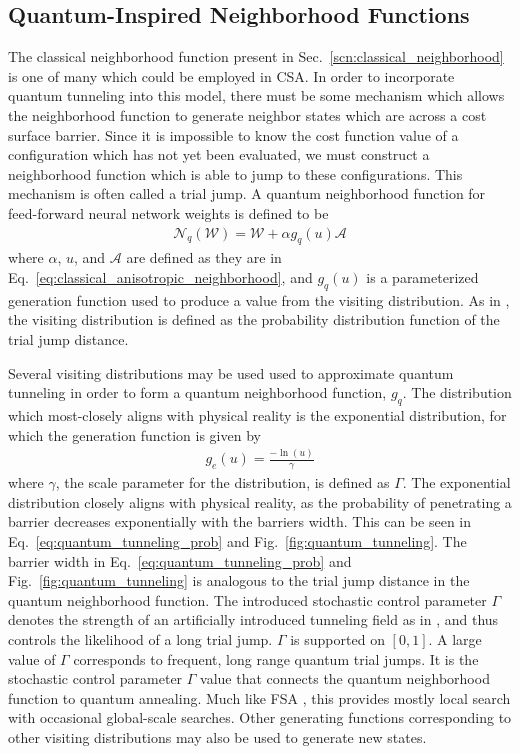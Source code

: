 \documentclass[11pt]{afthesis}
\begin{document}
	\subsection{Quantum-Inspired Neighborhood Functions}
	\label{scn:quantum_neighborhood}
	
	The classical neighborhood function present in Sec.~\ref{scn:classical_neighborhood} is one of many which could be employed in CSA. In order to incorporate quantum tunneling into this model, there must be some mechanism which allows the neighborhood function to generate neighbor states which are across a cost surface barrier. Since it is impossible to know the cost function value of a configuration which has not yet been evaluated, we must construct a neighborhood function which is able to jump to these configurations. This mechanism is often called a trial jump. A quantum neighborhood function for feed-forward neural network weights is defined to be
	\begin{align}\label{eq:quantum_anisotropic_neighborhood}
	\mathcal{N}_{q} (\boldsymbol{\mathcal{W}}) = \boldsymbol{\mathcal{W}} + \alpha g_{q}(u) \boldsymbol{\mathcal{A}} 
	\end{align}
	\noindent where $\alpha$, $u$, and $\boldsymbol{\mathcal{A}}$ are defined as they are in Eq.~\ref{eq:classical_anisotropic_neighborhood}, and $g_{q}(u)$ is a parameterized generation function used to produce a value from the visiting distribution. As in \cite{tsallis1996generalizedsimulatedannealing}, the visiting distribution is defined as the probability distribution function of the trial jump distance. 
	
	Several visiting distributions may be used used to approximate quantum tunneling in order to form a quantum neighborhood function, $g_{q}$. The distribution which most-closely aligns with physical reality is the exponential distribution, for which the generation function is given by
	\begin{align}\label{eq:exp_generation_fcn}
	g_{e}(u) =  \frac{-\ln(u)}{\gamma}
	\end{align}
	\noindent where $\gamma$, the scale parameter for the distribution, is defined as $\Gamma$. The exponential distribution closely aligns with physical reality, as the probability of penetrating a barrier decreases exponentially with the barriers width. This can be seen in Eq.~\ref{eq:quantum_tunneling_prob} and Fig.~\ref{fig:quantum_tunneling}. The barrier width in Eq.~\ref{eq:quantum_tunneling_prob} and Fig.~\ref{fig:quantum_tunneling} is analogous to the trial jump distance in the quantum neighborhood function. The introduced stochastic control parameter $\Gamma$ denotes the strength of an artificially introduced tunneling field as in \cite{mukherjee2015multivariatesearchqa}, and thus controls the likelihood of a long trial jump. $\Gamma$ is supported on $[0,1]$. A large value of $\Gamma$ corresponds to frequent, long range quantum trial jumps. It is the stochastic control parameter $\Gamma$ value that connects the quantum neighborhood function to quantum annealing. Much like FSA \cite{szu1987fastsimulatedannealing}, this provides mostly local search with occasional global-scale searches. Other generating functions corresponding to other visiting distributions may also be used to generate new states. 
	
\end{document}
